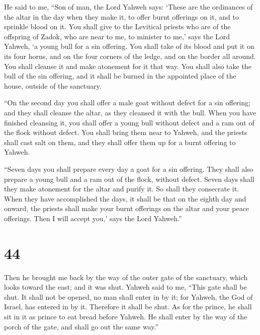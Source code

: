  He said to me, ``Son of man, the Lord Yahweh says: `These
are the ordinances of the altar in the day when they make it, to offer
burnt offerings on it, and to sprinkle blood on it.  You
shall give to the Levitical priests who are of the offspring of Zadok,
who are near to me, to minister to me,' says the Lord Yahweh, `a young
bull for a sin offering.  You shall take of its blood and
put it on its four horns, and on the four corners of the ledge, and on
the border all around. You shall cleanse it and make atonement for it
that way.  You shall also take the bull of the sin
offering, and it shall be burned in the appointed place of the house,
outside of the sanctuary.

 ``On the second day you shall offer a male goat without
defect for a sin offering; and they shall cleanse the altar, as they
cleansed it with the bull.  When you have finished
cleansing it, you shall offer a young bull without defect and a ram out
of the flock without defect.  You shall bring them near to
Yahweh, and the priests shall cast salt on them, and they shall offer
them up for a burnt offering to Yahweh.

 ``Seven days you shall prepare every day a goat for a sin
offering. They shall also prepare a young bull and a ram out of the
flock, without defect.  Seven days shall they make
atonement for the altar and purify it. So shall they consecrate it.
 When they have accomplished the days, it shall be that on
the eighth day and onward, the priests shall make your burnt offerings
on the altar and your peace offerings. Then I will accept you,' says the
Lord Yahweh.''

\hypertarget{section-42}{%
\section{44}\label{section-42}}

 Then he brought me back by the way of the outer gate of the
sanctuary, which looks toward the east; and it was shut. 
Yahweh said to me, ``This gate shall be shut. It shall not be opened, no
man shall enter in by it; for Yahweh, the God of Israel, has entered in
by it. Therefore it shall be shut.  As for the prince, he
shall sit in it as prince to eat bread before Yahweh. He shall enter by
the way of the porch of the gate, and shall go out the same way.''


